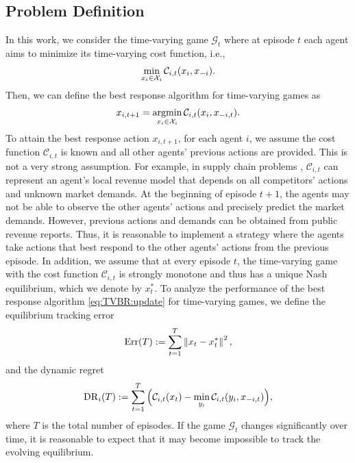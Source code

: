\subsection{Problem Definition}
In this work, we consider the time-varying game $\mathcal{G}_t$ where at episode $t$ each agent aims to minimize its time-varying cost function, i.e.,
\begin{align}\label{eq:def:TV:game}
    \mathop{{\rm{min}}}_{x_i \in \mathcal{X}_i} \mathcal{C}_{i,t}(x_i,x_{-i}).
\end{align}
Then, we can define the best response algorithm for time-varying games as
\begin{align}\label{eq:TVBR:update}
    x_{i,t+1} = \mathop{\rm{arg min}}_{x_i \in \mathcal{X}_i} \mathcal{C}_{i,t} (x_i, x_{-i,t}).
\end{align}
%
To attain the best response action $x_{i,t+1}$, for each agent $i$, we assume the cost function $\mathcal{C}_{i,t}$ is known and all other agents' previous actions are provided. This is not a very strong assumption. For example, in supply chain problems \cite{cachon2006game}, $\mathcal{C}_{i,t}$ can represent an agent's local revenue model that depends on all competitors' actions and unknown market demands. At the beginning of episode $t+1$, the agents may not be able to observe the other agents' actions and precisely predict the market demands. However, previous actions and demands can be obtained from public revenue reports. 
%
Thus, it is reasonable to implement a strategy where the agents take actions that best respond to the other agents' actions from the previous episode. 
%
In addition, we assume that at every episode $t$, the time-varying game with the cost function $\mathcal{C}_{i,t}$ is strongly monotone and thus has a unique Nash equilibrium, which we denote by $x_t^{*}$.
To analyze the performance of the best response algorithm \eqref{eq:TVBR:update} for time-varying games, we define the equilibrium tracking error 
\begin{align}\label{eq:BRTV:trackingerror}
    {\rm{Err}}(T):=\sum_{t=1}^T\left\| x_t - x_t^{*}\right\|^2,
\end{align}
and the dynamic regret
\begin{align}\label{eq:BRTV:dynamic:regret}
    {\rm{DR}}_i(T) := \sum_{t=1}^T \Big( \mathcal{C}_{i,t}(x_t) - \mathop{\rm{min}}_{y_i} \mathcal{C}_{i,t}(y_i,x_{-i,t})\Big),
\end{align}
where $T$ is the total number of episodes.
If the game $\mathcal{G}_t$ changes significantly over time, it is reasonable to expect that it may become impossible to track the evolving equilibrium. 
